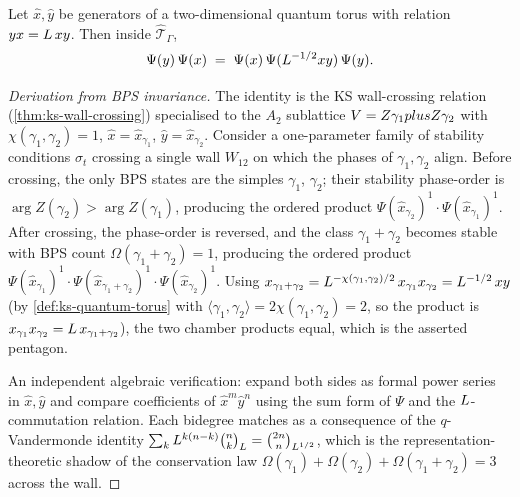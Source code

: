 \begin{theorem}
  \label{thm:psi-pentagon}
  Let $\hat{x}, \hat{y}$ be generators of a two-dimensional quantum torus with
  relation $yx = L\, xy$. Then inside $\hat{\mathcal{T}}_\Gamma$,
  \[
    \Psi(y)\, \Psi(x) \;=\; \Psi(x)\, \Psi(L^{-1/2} xy)\, \Psi(y).
  \]
\end{theorem}

\begin{proof}[Derivation from BPS invariance]
  The identity is the KS wall-crossing relation
  (\cref{thm:ks-wall-crossing}) specialised to the $A_2$ sublattice
  $V = Z \gamma_1 plus Z \gamma_2$ with $\chi(\gamma_1, \gamma_2) = 1$,
  $\hat{x} = \hat{x}_{\gamma_1}$, $\hat{y} = \hat{x}_{\gamma_2}$. Consider a
  one-parameter family of stability conditions $\sigma_t$ crossing a
  single wall $W_{12}$ on which the phases of $\gamma_1, \gamma_2$
  align. Before crossing, the only BPS states are the simples
  $\gamma_1$, $\gamma_2$; their stability phase-order is
  $\arg Z(\gamma_2) > \arg Z(\gamma_1)$, producing the ordered product
  $\Psi(\hat{x}_{\gamma_2})^1 \cdot \Psi(\hat{x}_{\gamma_1})^1$. After
  crossing, the phase-order is reversed, and the class
  $\gamma_1 + \gamma_2$ becomes stable with BPS count $\Omega(\gamma_1 + \gamma_2) = 1$,
  producing the ordered product
  $\Psi(\hat{x}_{\gamma_1})^1 \cdot \Psi(\hat{x}_{\gamma_1 + \gamma_2})^1 \cdot \Psi(\hat{x}_{\gamma_2})^1$.
  Using $x_{\gamma_1 + \gamma_2} = L^{-\chi(\gamma_1, \gamma_2)/2}\, x_{\gamma_1} x_{\gamma_2} = L^{-1/2}\, xy$
  (by \cref{def:ks-quantum-torus} with $\langle \gamma_1, \gamma_2\rangle = 2\chi(\gamma_1, \gamma_2) = 2$,
  so the product is $x_{\gamma_1} x_{\gamma_2} = L\, x_{\gamma_1 + \gamma_2}$),
  the two chamber products equal, which is the asserted pentagon.

  An independent algebraic verification: expand both sides as formal
  power series in $\hat{x}, \hat{y}$ and compare coefficients of $\hat{x}^m \hat{y}^n$
  using the sum form of $\Psi$ and the $L$-commutation relation. Each
  bidegree matches as a consequence of the $q$-Vandermonde identity
  $\sum_k L^{k(n-k)} \binom{n}{k}_{L} = \binom{2n}{n}_{L^{1/2}}$,
  which is the representation-theoretic shadow of the conservation law
  $\Omega(\gamma_1) + \Omega(\gamma_2) + \Omega(\gamma_1 + \gamma_2) = 3$
  across the wall.
\end{proof}

